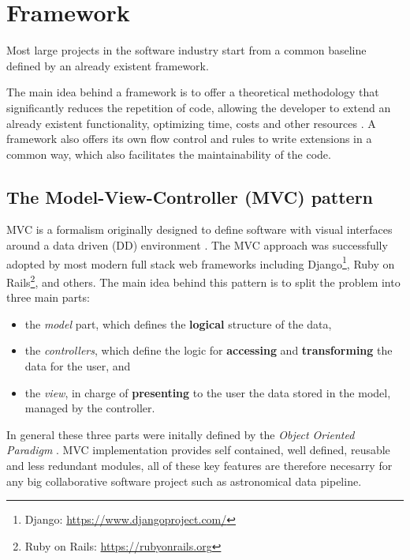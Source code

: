 \documentclass[final,5p,times,twocolumn,authoryear]{elsarticle}
\begin{document}
\section{Framework}
\label{section:framework}

Most large projects in the software industry start from a common baseline
defined by an already existent framework.

The main idea behind a framework is to offer a theoretical
methodology that significantly reduces the repetition of code,
allowing the developer to extend an already existent functionality, optimizing time, costs and other resources \citep{baumer1997framework, pierro_web2py_2011}.
%
A framework also offers its own flow control and rules to write extensions in a common way,
which also facilitates the maintainability of the code.
%

\subsection{The Model-View-Controller (MVC) pattern}
\label{mvc}

MVC is a formalism originally designed to define software with visual interfaces
around a data driven (DD) environment \citep{krasner_description_1988}.
The MVC approach was successfully adopted by most
modern full stack web frameworks including 
Django\footnote{Django: \url{https://www.djangoproject.com/}}, 
Ruby on Rails\footnote{Ruby on Rails: \url{https://rubyonrails.org}}, and others.
%
The main idea behind this pattern is to split the problem into three main parts:
%
\begin{itemize}
 \item the \textit{model} part, which defines the \textbf{logical} structure of the data,
 \item the \textit{controllers}, which define the logic for \textbf{accessing} and \textbf{transforming} the data for the user, and
 \item the \textit{view}, in charge of \textbf{presenting} to the user the data stored in the model, managed by the controller.
\end{itemize}
%
In general these three parts were initally defined by the \textit{Object Oriented
Paradigm} \citep[OOP,][]{coad1992object}.
%
MVC implementation provides self contained, well defined,
reusable and less redundant modules, all of these key features
are therefore necesarry for any big collaborative software project such as astronomical data pipeline.
\end{document}
